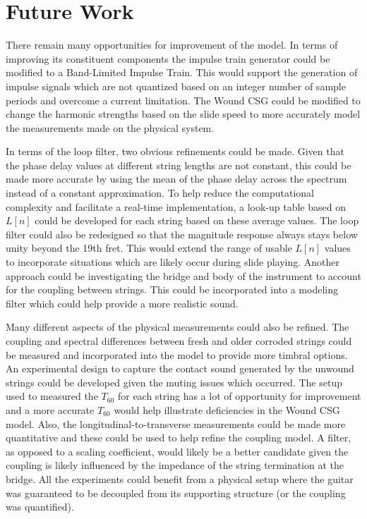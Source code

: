 \documentclass[../main.tex]{subfiles}
\begin{document}
\section{Future Work}
There remain many opportunities for improvement of the model. In terms of improving its constituent components the impulse train generator could be modified to a Band-Limited Impulse Train. This would support the generation of impulse signals which are not quantized based on an integer number of sample periods and overcome a current limitation. The Wound CSG could be modified to change the harmonic strengths based on the slide speed to more accurately model the measurements made on the physical system.

In terms of the loop filter, two obvious refinements could be made. Given that the phase delay values at different string lengths are not constant, this could be made more accurate by using the mean of the phase delay across the spectrum instead of a constant approximation. To help reduce the computational complexity and facilitate a real-time implementation, a look-up table based on $L[n]$ could be developed for each string based on these average values. The loop filter could also be redesigned so that the magnitude response always stays below unity beyond the 19th fret. This would extend the range of usable $L[n]$ values to incorporate situations which are likely occur during slide playing. Another approach could be investigating the bridge and body of the instrument to account for the coupling between strings. This could be incorporated into a modeling filter which could help provide a more realistic sound.

Many different aspects of the physical measurements could also be refined. The coupling and spectral differences between fresh and older corroded strings could be measured and incorporated into the model to provide more timbral options. An experimental design to capture the contact sound generated by the unwound strings could be developed given the muting issues which occurred. The setup used to measured the $T_{60}$ for each string has a lot of opportunity for improvement and a more accurate $T_{60}$ would help illustrate deficiencies in the Wound CSG model. Also, the longitudinal-to-transverse measurements could be made more quantitative and these could be used to help refine the coupling model. A filter, as opposed to a scaling coefficient, would likely be a better candidate given the coupling is likely influenced by the impedance of the string termination at the bridge. All the experiments could benefit from a physical setup where the guitar was guaranteed to be decoupled from its supporting structure (or the coupling was quantified).
\end{document}
